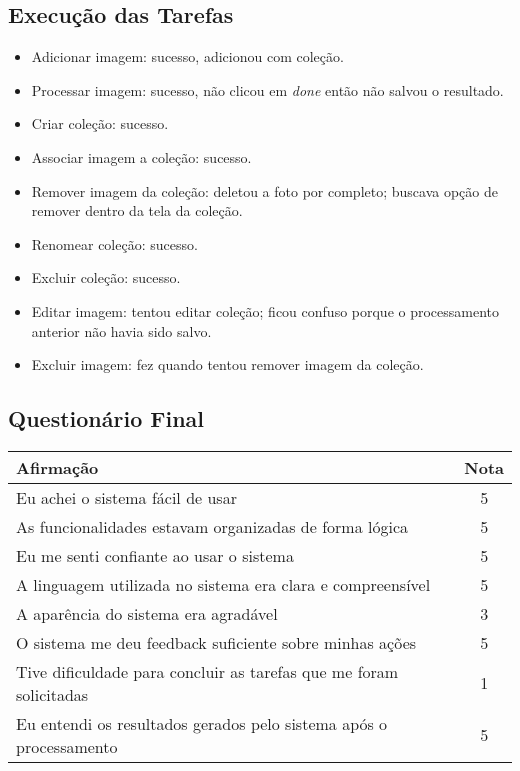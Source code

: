 \subsection*{Execução das Tarefas}
\begin{itemize}
    \item Adicionar imagem: sucesso, adicionou com coleção.
    \item Processar imagem: sucesso, não clicou em \textit{done} então não salvou o resultado.
    \item Criar coleção: sucesso.
    \item Associar imagem a coleção: sucesso.
    \item Remover imagem da coleção: deletou a foto por completo; buscava opção de remover dentro da tela da coleção.
    \item Renomear coleção: sucesso.
    \item Excluir coleção: sucesso.
    \item Editar imagem: tentou editar coleção; ficou confuso porque o processamento anterior não havia sido salvo.
    \item Excluir imagem: fez quando tentou remover imagem da coleção.
\end{itemize}

\newpage

\subsection*{Questionário Final}
\begin{center}
\begin{tabular}{|p{10cm}|c|}
\hline
\textbf{Afirmação} & \textbf{Nota} \\
\hline
Eu achei o sistema fácil de usar & 5 \\
As funcionalidades estavam organizadas de forma lógica & 5 \\
Eu me senti confiante ao usar o sistema & 5 \\
A linguagem utilizada no sistema era clara e compreensível & 5 \\
A aparência do sistema era agradável & 3 \\
O sistema me deu feedback suficiente sobre minhas ações & 5 \\
Tive dificuldade para concluir as tarefas que me foram solicitadas & 1 \\
Eu entendi os resultados gerados pelo sistema após o processamento & 5 \\
\hline
\end{tabular}
\end{center}

